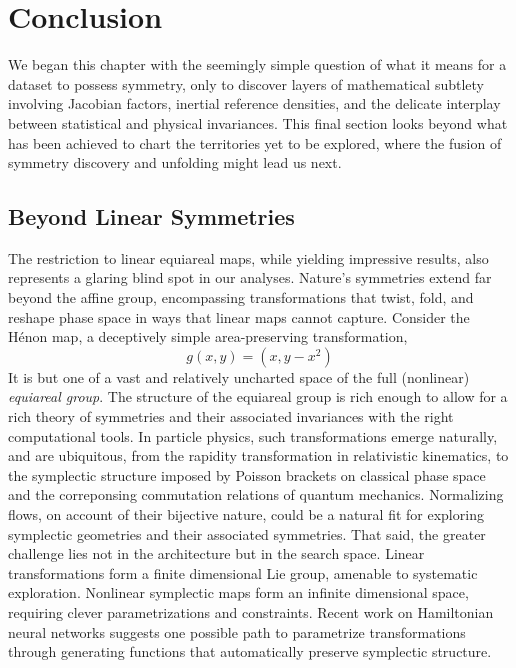 \section{Conclusion}
\label{sec:symmetrygan-conclusion}
    We began this chapter with the seemingly simple question of what it means for a dataset to possess symmetry, only to discover layers of mathematical subtlety involving Jacobian factors, inertial reference densities, and the delicate interplay between statistical and physical invariances.
    This final section looks beyond what has been achieved to chart the territories yet to be explored, where the fusion of symmetry discovery and unfolding might lead us next.

    \subsection{Beyond Linear Symmetries}
        The restriction to linear equiareal maps, while yielding impressive results, also represents a glaring blind spot in our analyses.
        Nature's symmetries extend far beyond the affine group, encompassing transformations that twist, fold, and reshape phase space in ways that linear maps cannot capture.
        Consider the Hénon map, a deceptively simple area-preserving transformation,
        \[
            g(x,y) = (x, y - x^2)
        \]
        It is but one of a vast and relatively uncharted space of the full (nonlinear) \emph{equiareal group}.
        The structure of the equiareal group is rich enough to allow for a rich theory of symmetries and their associated invariances with the right computational tools.
        In particle physics, such transformations emerge naturally, and are ubiquitous, from the rapidity transformation in relativistic kinematics, to the symplectic structure imposed by Poisson brackets on classical phase space and the correponsing commutation relations of quantum mechanics.
        Normalizing flows, on account of their bijective nature, could be a natural fit for exploring symplectic geometries and their associated symmetries.
        That said, the greater challenge lies not in the architecture but in the search space.
        Linear transformations form a finite dimensional Lie group, amenable to systematic exploration.
        Nonlinear symplectic maps form an infinite dimensional space, requiring clever parametrizations and constraints.
        Recent work on Hamiltonian neural networks suggests one possible path to parametrize transformations through generating functions that automatically preserve symplectic structure.
        
